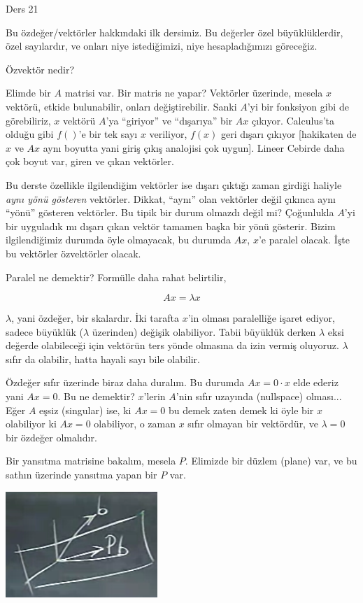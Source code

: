 \documentclass[12pt,fleqn]{article}\usepackage{../../common}
\begin{document}
Ders 21

Bu özdeğer/vektörler hakkındaki ilk dersimiz. Bu değerler özel
büyüklüklerdir, özel sayılardır, ve onları niye istediğimizi, niye
hesapladığımızı göreceğiz.

Özvektör nedir? 

Elimde bir $A$ matrisi var. Bir matris ne yapar? Vektörler üzerinde, mesela
$x$ vektörü, etkide bulunabilir, onları değiştirebilir. Sanki $A$'yi bir
fonksiyon gibi de görebiliriz, $x$ vektörü $A$'ya ``giriyor'' ve
``dışarıya'' bir $Ax$ çıkıyor. Calculus'ta olduğu gibi $f()$'e bir tek sayı
$x$ veriliyor, $f(x)$ geri dışarı çıkıyor [hakikaten de $x$ ve $Ax$ aynı
boyutta yani giriş çıkış analojisi çok uygun]. Lineer Cebirde daha çok
boyut var, giren ve çıkan vektörler.

Bu derste özellikle ilgilendiğim vektörler ise dışarı çıktığı zaman girdiği
haliyle {\em aynı yönü gösteren} vektörler. Dikkat, ``aynı'' olan vektörler
değil çıkınca aynı ``yönü'' gösteren vektörler. Bu tipik bir durum olmazdı
değil mi? Çoğunlukla $A$'yi bir uyguladık mı dışarı çıkan vektör tamamen
başka bir yönü gösterir. Bizim ilgilendiğimiz durumda öyle olmayacak, bu
durumda $Ax$, $x$'e paralel olacak. İşte bu vektörler özvektörler olacak. 

Paralel ne demektir? Formülle daha rahat belirtilir,

$$ Ax = \lambda x $$

$\lambda$, yani özdeğer, bir skalardır. İki tarafta $x$'in olması
paralelliğe işaret ediyor, sadece büyüklük ($\lambda$ üzerinden) değişik
olabiliyor. Tabii büyüklük derken $\lambda$ eksi değerde olabileceği için
vektörün ters yönde olmasına da izin vermiş oluyoruz. $\lambda$ sıfır da
olabilir, hatta hayali sayı bile olabilir.

Özdeğer sıfır üzerinde biraz daha duralım. Bu durumda $Ax = 0 \cdot x$ elde
ederiz yani $Ax = 0$. Bu ne demektir? $x$'lerin $A$'nin sıfır uzayında
(nullspace) olması... Eğer $A$ eşsiz (singular) ise, ki $Ax = 0$ bu demek
zaten demek ki öyle bir $x$ olabiliyor ki $Ax = 0$ olabiliyor, o zaman $x$
sıfır olmayan bir vektördür, ve $\lambda = 0$ bir özdeğer olmalıdır.

Bir yansıtma matrisine bakalım, mesela $P$. Elimizde bir düzlem (plane)
var, ve bu sathın üzerinde yansıtma yapan bir $P$ var. 

\includegraphics[height=4cm]{21_1.png}
\end{document}
